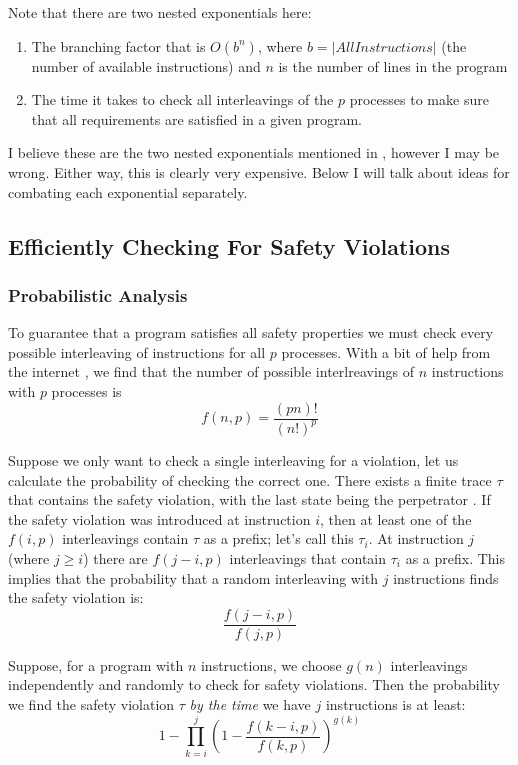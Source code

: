 \documentclass[12pt]{article}
\begin{document}
Note that there are two nested exponentials here:
	\begin{enumerate}
		\item The branching factor that is $O(b^n)$, where $b=|AllInstructions|$ (the number of available instructions) and $n$ is the number of lines in the program
		\item The time it takes to check all interleavings of the $p$ processes to make sure that all requirements are satisfied in a given program.  
	\end{enumerate}

I believe these are the two nested exponentials mentioned in \cite{asdp}, however I may be wrong.  Either way, this is clearly very expensive.  Below I will talk about ideas for combating each exponential separately.  

\subsection{Efficiently Checking For Safety Violations}
\subsubsection{Probabilistic Analysis}
To guarantee that a program satisfies all safety properties we must check every possible interleaving of instructions for all $p$ processes.  With a bit of help from the internet \cite{il}, we find that the number of possible interlreavings of $n$ instructions with $p$ processes is $$f(n,p)=\frac{(pn)!}{(n!)^p}$$

Suppose we only want to check a single interleaving for a violation, let us calculate the probability of checking the correct one.  There exists a finite trace $\tau$ that contains the safety violation, with the last state being the perpetrator \cite{def}.  If the safety violation was introduced at instruction $i$, then at least one of the $f(i,p)$ interleavings contain $\tau$ as a prefix; let's call this $\tau_i$.  At instruction $j$ (where $j \geq i$) there are $f(j-i,p)$ interleavings that contain $\tau_i$ as a prefix.  This implies that the probability that a random interleaving with $j$ instructions finds the safety violation is: $$\frac{f(j-i,p)}{f(j,p)}$$

Suppose, for a program with $n$ instructions, we choose $g(n)$ interleavings independently and randomly to check for safety violations.  Then the probability we find the safety violation $\tau$ \textit{by the time} we have $j$ instructions is at least:
$$1 - \prod\limits_{k=i}^j \left(1 - \frac{f(k-i,p)}{f(k,p)}\right)^{g(k)}$$
\end{document}
